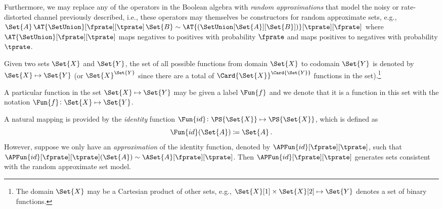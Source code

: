 \documentclass[ ../main.tex]{subfiles}
\begin{document}
Furthermore, we may replace any of the operators in the Boolean algebra with \emph{random approximations} that model the noisy or rate-distorted channel previously described, i.e., these operators may themselves be constructors for random approximate sets, e.g., $\Set{A} \, \AT{\SetUnion}[\fprate][\tprate] \, \Set{B} \sim \AT{(\SetUnion[\Set{A}][\Set{B}])}[\tprate][\fprate]$ where $\AT{\SetUnion}[\fprate][\tprate]$ maps negatives to positives with probability $\fprate$ and maps positives to negatives with probability $\tprate$.

Given two sets $\Set{X}$ and $\Set{Y}$, the set of all possible functions from domain $\Set{X}$ to codomain $\Set{Y}$ is denoted by $\Set{X} \mapsto \Set{Y}$ (or $\Set{X}^{\Set{Y}}$ since there are a total of $\Card{\Set{X}}^{\Card{\Set{Y}}}$ functions in the set).\footnote{The domain $\Set{X}$ may be a Cartesian product of other sets, e.g., $\Set{X}[1] \times \Set{X}[2] \mapsto \Set{Y}$ denotes a set of binary functions.}

A particular function in the set $\Set{X} \mapsto \Set{Y}$ may be given a label $\Fun{f}$ and we denote that it is a function in this set with the notation $\Fun{f} \colon \Set{X} \mapsto \Set{Y}$.


A natural mapping is provided by the \emph{identity} function $\Fun{id} \colon \PS{\Set{X}} \mapsto \PS{\Set{X}}$, which is defined as
\begin{equation}
\Fun{id}(\Set{A}) \coloneqq \Set{A}\,.
\end{equation}
However, suppose we only have an \emph{approximation} of the identity function, denoted by $\APFun{id}[\fprate][\tprate]$, such that $\APFun{id}[\fprate][\tprate](\Set{A}) \sim \ASet{A}[\fprate][\tprate]$.
Then $\APFun{id}[\fprate][\tprate]$ generates sets consistent with the random approximate set model.
\end{document}
